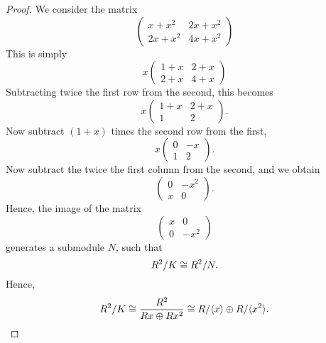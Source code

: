 \documentclass{unswmaths}
\begin{document}
\begin{proof}
    We consider the matrix
    \begin{equation*}
        \begin{pmatrix}
            x+x^2 & 2x+x^2\\
            2x+x^2 & 4x+x^2
        \end{pmatrix}
    \end{equation*}
    This is simply
    \begin{equation*}
        x\begin{pmatrix}
            1+x & 2+x\\
            2+x & 4+x
        \end{pmatrix}
    \end{equation*}
    Subtracting twice the first row from the second, this becomes
    \begin{equation*}
        x\begin{pmatrix}
            1+x & 2+x\\
            1 & 2
        \end{pmatrix}.
    \end{equation*}
    Now subtract $(1+x)$ times the second row from the first,
    \begin{equation*}
        x\begin{pmatrix}
            0 & -x\\
            1 & 2
        \end{pmatrix}.
    \end{equation*}
    Now subtract the twice the first column from the second, and we obtain
    \begin{equation*}
        \begin{pmatrix}
            0 & -x^2\\
            x & 0
        \end{pmatrix}.
    \end{equation*}
    Hence, the image of the matrix
    \begin{equation*}
    \begin{pmatrix}
        x & 0\\
        0 & -x^2
    \end{pmatrix}
    \end{equation*}
    generates a submodule $N$, such that
    \begin{equation*}
        R^2/K \cong R^2/N.
    \end{equation*}
    Hence,
    \begin{equation*}
        R^2/K \cong \frac{R^2}{Rx\oplus Rx^2} \cong R/\langle x\rangle \oplus R/\langle x^2\rangle.
    \end{equation*}
\end{proof}
    
\end{document}
